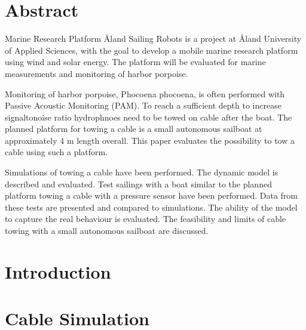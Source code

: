 \documentclass[twoside,11pt]{report} %
\begin{document}
\renewcommand{\contentsname}{Contents}	%
\renewcommand{\bibname}{Bibliography}	%


\chapter*{Abstract}

Marine Research Platform \r{A}land Sailing Robots is a project at \r{A}land University of Applied  Sciences, with the goal to develop a mobile marine research platform using wind and solar energy. The platform will be evaluated for marine measurements and monitoring of harbor porpoise.

Monitoring of harbor porpoise, Phocoena phocoena, is often performed with Passive Acoustic Monitoring (PAM). To reach a sufficient depth to increase signaltonoise ratio hydrophnoes need to be towed on cable after the boat. The planned platform for towing a cable is a small autonomous sailboat at approximately 4 m length overall. This paper evaluates the possibility to tow a cable using such a platform.
   
Simulations of towing a cable have been performed. The dynamic model is described and evaluated. Test sailings with a boat similar to the planned platform towing a cable with a pressure sensor have been performed. Data from these tests are presented and compared to simulations. The ability of the model to capture the real behaviour is evaluated. The feasibility and limits of cable towing with a small autonomous sailboat are discussed.
   

\tableofcontents  %

\chapter*{Introduction}

\chapter{Cable Simulation}

\end{document}
